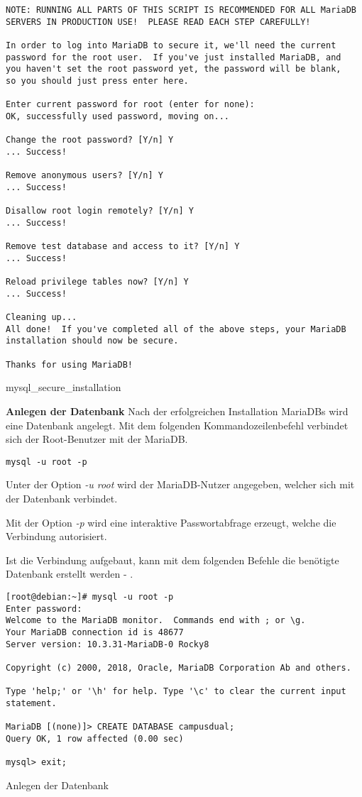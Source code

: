 \begin{code}
    \begin{verbatim}
NOTE: RUNNING ALL PARTS OF THIS SCRIPT IS RECOMMENDED FOR ALL MariaDB
SERVERS IN PRODUCTION USE!  PLEASE READ EACH STEP CAREFULLY!

In order to log into MariaDB to secure it, we'll need the current
password for the root user.  If you've just installed MariaDB, and
you haven't set the root password yet, the password will be blank,
so you should just press enter here.
  
Enter current password for root (enter for none): 
OK, successfully used password, moving on...

Change the root password? [Y/n] Y
... Success!

Remove anonymous users? [Y/n] Y
... Success!
  
Disallow root login remotely? [Y/n] Y
... Success!
  
Remove test database and access to it? [Y/n] Y
... Success!
  
Reload privilege tables now? [Y/n] Y
... Success!
  
Cleaning up...
All done!  If you've completed all of the above steps, your MariaDB
installation should now be secure.
  
Thanks for using MariaDB!
    \end{verbatim}
    \caption[mysql\_secure\_installation]{mysql\_secure\_installation}
    \label{mysql_secure_installation}
\end{code}

\textbf{Anlegen der Datenbank}
Nach der erfolgreichen Installation MariaDBs wird eine Datenbank angelegt.
Mit dem folgenden Kommandozeilenbefehl verbindet sich der Root-Benutzer mit der MariaDB.

\texttt{mysql -u root -p}

Unter der Option \textit{-u root} wird der MariaDB-Nutzer angegeben, welcher sich mit der Datenbank verbindet.

Mit der Option \textit{-p} wird eine interaktive Passwortabfrage erzeugt, welche die Verbindung autorisiert.

Ist die Verbindung aufgebaut, kann mit dem folgenden Befehle die benötigte Datenbank erstellt werden - .

\begin{code}
    \begin{verbatim}
[root@debian:~]# mysql -u root -p
Enter password:
Welcome to the MariaDB monitor.  Commands end with ; or \g.
Your MariaDB connection id is 48677
Server version: 10.3.31-MariaDB-0 Rocky8

Copyright (c) 2000, 2018, Oracle, MariaDB Corporation Ab and others.

Type 'help;' or '\h' for help. Type '\c' to clear the current input statement.

MariaDB [(none)]> CREATE DATABASE campusdual;
Query OK, 1 row affected (0.00 sec)

mysql> exit;
    \end{verbatim}
    \caption[Anlegen der Datenbank]{Anlegen der Datenbank}
    \label{Anlegen der Datenbank}
\end{code}


